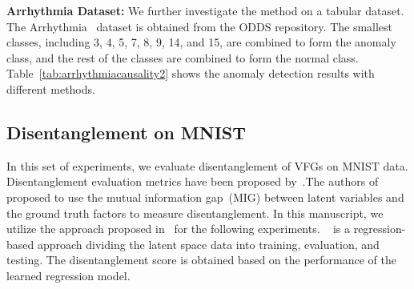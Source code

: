 \documentclass{article} %
\begin{document}



%
%


  
\textbf{Arrhythmia Dataset: }
We further investigate the method on a tabular dataset.  The Arrhythmia~\citep{Dua:2019} dataset is  obtained from the ODDS repository. The smallest classes, including 3, 4, 5, 7, 8, 9, 14, and 15, are combined to form the anomaly class, and the rest of the classes are combined to form the normal class. Table~\ref{tab:arrhythmiacausality2} shows the anomaly detection results with different methods. 

\vspace{-0.05in}
\subsection{Disentanglement on MNIST}
\vspace{-0.05in}
In this set of experiments, we evaluate disentanglement of VFGs on MNIST data. Disentanglement evaluation metrics have been proposed by~\cite{Karaletsos2015BayesianRL, Glorot2011DomainAF, Higgins17, Kim18, Eastwood18}.The authors of~\cite{Chen18} proposed to use the mutual information gap~(MIG) between latent variables and the ground truth factors to measure disentanglement.  In this manuscript, we utilize the approach proposed in~\citet{Eastwood18}  for the following experiments. ~\cite{Eastwood18} is a regression-based approach dividing the latent space data into training, evaluation, and testing. The disentanglement score is obtained based on the performance of the learned regression model. 
\end{document}
